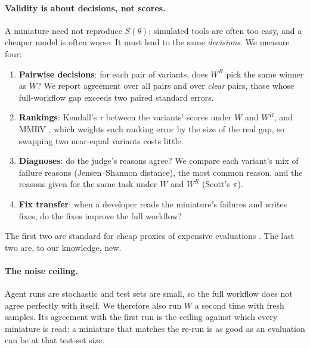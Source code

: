\paragraph{Validity is about decisions, not scores.}
A miniature need not reproduce $S(\theta)$; simulated tools are often too easy, and a cheaper
model is often worse. It must lead to the same \emph{decisions}. We measure four:
\begin{enumerate}
  \item \textbf{Pairwise decisions}: for each pair of variants, does $W^R$ pick the same winner as
  $W$? We report agreement over all pairs and over \emph{clear} pairs, those whose full-workflow
  gap exceeds two paired standard errors.
  \item \textbf{Rankings}: Kendall's $\tau$ between the variants' scores under $W$ and $W^R$, and
  MMRV \citep{li2024evaluating}, which weights each ranking error by the size of the real gap, so
  swapping two near-equal variants costs little.
  \item \textbf{Diagnoses}: do the judge's reasons agree? We compare each variant's mix of failure
  reasons (Jensen--Shannon distance), the most common reason, and the reasons given for the same
  task under $W$ and $W^R$ (Scott's $\pi$).
  \item \textbf{Fix transfer}: when a developer reads the miniature's failures and writes fixes, do
  the fixes improve the full workflow?
\end{enumerate}
The first two are standard for cheap proxies of expensive evaluations
\citep{magnusson2025datadecide,li2024evaluating}. The last two are, to our knowledge, new.

\paragraph{The noise ceiling.}
Agent runs are stochastic and test sets are small, so the full workflow does not agree perfectly
with itself. We therefore also run $W$ a second time with fresh samples. Its agreement with the
first run is the ceiling against which every miniature is read: a miniature that matches the
re-run is as good as an evaluation can be at that test-set size.
